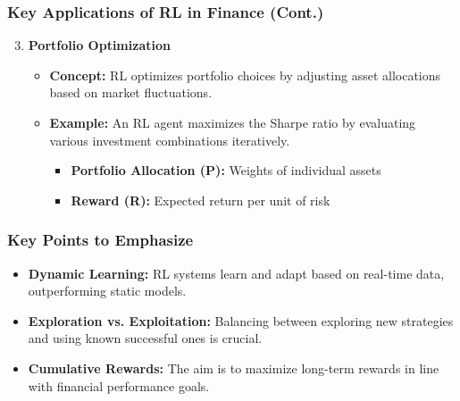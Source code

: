 \documentclass[aspectratio=169]{beamer}
\begin{document}
\begin{frame}[fragile]
    \frametitle{Key Applications of RL in Finance (Cont.)}
    \begin{enumerate}
        \setcounter{enumi}{2} %
        \item \textbf{Portfolio Optimization}
            \begin{itemize}
                \item \textbf{Concept:} RL optimizes portfolio choices by adjusting asset allocations based on market fluctuations.
                \item \textbf{Example:} An RL agent maximizes the Sharpe ratio by evaluating various investment combinations iteratively.
                    \begin{itemize}
                        \item \textbf{Portfolio Allocation (P):} Weights of individual assets
                        \item \textbf{Reward (R):} Expected return per unit of risk
                    \end{itemize}
            \end{itemize}
    \end{enumerate}
\end{frame}

\begin{frame}[fragile]
    \frametitle{Key Points to Emphasize}
    \begin{itemize}
        \item \textbf{Dynamic Learning:} RL systems learn and adapt based on real-time data, outperforming static models.
        \item \textbf{Exploration vs. Exploitation:} Balancing between exploring new strategies and using known successful ones is crucial.
        \item \textbf{Cumulative Rewards:} The aim is to maximize long-term rewards in line with financial performance goals.
    \end{itemize}
\end{frame}
\end{document}
